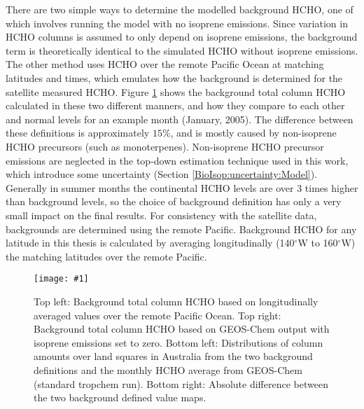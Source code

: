 \documentclass[acp, manuscript]{copernicus}
\newcommand{\degr}{$^{\circ}$}
\newcommand{\mypic}[3]{%
  \begin{figure}
    \texttt{[image: \#1]}
    \caption{#2}
    #3
  \end{figure}
}
\begin{document}
    There are two simple ways to determine the modelled background HCHO, one of which involves running the model with no isoprene emissions. 
    Since variation in HCHO columns is assumed to only depend on isoprene emissions, the background term is theoretically identical to the simulated HCHO without isoprene emissions.
    The other method uses HCHO over the remote Pacific Ocean at matching latitudes and times, which emulates how the background is determined for the satellite measured HCHO.
    Figure \ref{BioIsop:method:fig_background_hcho} shows the background total column HCHO calculated in these two different manners, and how they compare to each other and normal levels for an example month (January, 2005).
    The difference between these definitions is approximately $15\%$, and is mostly caused by non-isoprene HCHO precursors (such as monoterpenes).
    Non-isoprene HCHO precursor emissions are neglected in the top-down estimation technique used in this work, which introduce some uncertainty (Section \ref{BioIsop:uncertainty:Model}).
    Generally in summer months the continental HCHO levels are over 3 times higher than background levels, so the choice of background definition has only a very small impact on the final results.
    For consistency with the satellite data, backgrounds are determined using the remote Pacific.
    Background HCHO for any latitude in this thesis is calculated by averaging longitudinally (140\degr W to 160\degr W) the matching latitudes over the remote Pacific.
    
    
    \mypic{Figures/GC/GC_background_hcho_200501.png}{%
      Top left: Background total column HCHO based on longitudinally averaged values over the remote Pacific Ocean.
      Top right: Background total column HCHO based on GEOS-Chem output with isoprene emissions set to zero.
      Bottom left: Distributions of column amounts over land squares in Australia from the two background definitions and the monthly HCHO average from GEOS-Chem (standard tropchem run).
      Bottom right: Absolute difference between the two background defined value maps.
      }{\label{BioIsop:method:fig_background_hcho}}
    
\end{document}

